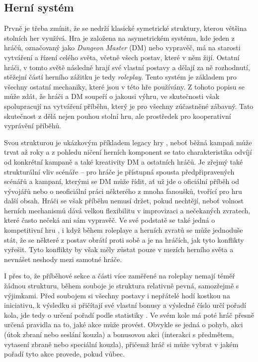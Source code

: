 \subsection{Herní systém}
\label{subsec:dnd_gameplay}

Prvně je třeba zmínit, že \dnd{} se nedrží klasické symetrické struktury, kterou většina stolních her využívá. Hra je založena na asymetrickém systému, kde jeden z hráčů, označovaný jako \textit{Dungeon Master} (DM) nebo vypravěč, má na starosti vytváření a řízení celého světa, včetně všech postav, které v něm žijí. Ostatní hráči, v tomto světě následně hrají své vlastní postavy a dělají za ně rozhodnutí, stěžejní částí herního zážitku je tedy \textit{roleplay}. Tento systém je základem pro všechny ostatní mechaniky, které jsou v této hře používány. Z tohoto popisu se může zdát, že hráči a DM soupeří o jakousi výhru, ve skutečnosti však spolupracují na vytváření příběhu, který je pro všechny zúčastněné zábavný. Tato skutečnost z \dnd{} dělá nejen pouhou stolní hru, ale prostředek pro kooperativní vyprávění příběhů.

Svou strukturou je \dnd{} ukázkovým příkladem legacy hry , neboť běžná kampaň může trvat až roky a z pohledu ničení herních komponent se tato charakteristika odvíjí od konkrétní kampaně a také kreativity DM a ostatních hráčů. Je zřejmý také strukturální vliv scénáře  -- pro hráče je přístupná spousta předpřipravených scénářů a kampaní, kterými se DM může řídit, ať už jde o oficiální příběh od vývojářů nebo o neoficiální práci některého z mnoha fanoušků, tvořící pro hru další obsah. Hráči se však příběhu nemusí držet, pokud nechtějí, neboť volnost herních mechanismů dává velkou flexibilitu v improvizaci a nečekaných zvratech, které často nečeká ani sám vypravěč. Ve své podstatě se také jedná o kompetitivní hru , i když během roleplaye a herních zvratů se může jednoduše stát, že se některé z postav obrátí proti sobě a je na hráčích, jak tyto konflikty vyřešit. Tyto konflikty by však měly zůstat pouze v mezích herního světa a nevnášet neshody mezi samotné hráče.

I přes to, že příběhové sekce a části více zaměřené na roleplay nemají téměř žádnou strukturu, během souboje je struktura relativně pevná, samozřejmě s výjimkami. Před soubojem si všechny postavy i nepřátelé hodí kostkou na iniciativu, k výsledku si přičítají své vlastní bonusy a výsledné číslo určí pořadí kola, jde tedy o určení pořadí podle statistiky . Ve svém kole má poté hráč přesně určená pravidla na to, jaké akce může provést. Obvykle se jedná o pohyb, akci (útok zbraní nebo seslání kouzla) a bonusovou akci (interakci s předmětem, vytasení zbraně nebo speciální kouzla), přičemž hráč si může vybrat v jakém pořadí tyto akce provede, pokud vůbec. 

